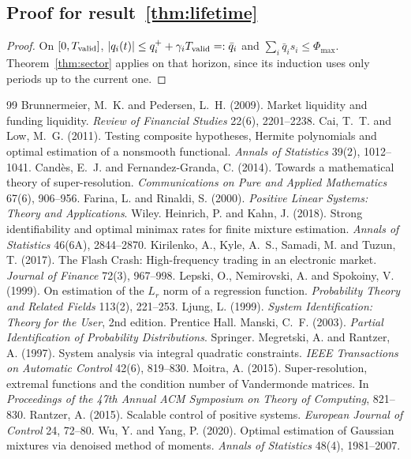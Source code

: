 \documentclass[11pt]{article}
\theoremstyle{definition}
\theoremstyle{remark}
\begin{document}
\subsection{Proof for result~\ref{thm:lifetime}}\label{app:paper3proof5}
\begin{proof}
On $[0,T_{\rm valid}]$, $|q_i(t)|\le q_i^++\gamma_iT_{\rm valid}=:\bar q_i$ and $\sum_i\bar q_is_i\le\Phi_{\max}$. Theorem~\ref{thm:sector} applies on that horizon, since its induction uses only periods up to the current one.
\end{proof}
\begin{thebibliography}{99}\setlength{\itemsep}{2pt}\small
{} Brunnermeier, M.~K. and Pedersen, L.~H. (2009). Market liquidity and funding liquidity. \emph{Review of Financial Studies} 22(6), 2201--2238.
 Cai, T.~T. and Low, M.~G. (2011). Testing composite hypotheses, Hermite polynomials and optimal estimation of a nonsmooth functional. \emph{Annals of Statistics} 39(2), 1012--1041.
 Cand\`es, E.~J. and Fernandez-Granda, C. (2014). Towards a mathematical theory of super-resolution. \emph{Communications on Pure and Applied Mathematics} 67(6), 906--956.
 Farina, L. and Rinaldi, S. (2000). \emph{Positive Linear Systems: Theory and Applications}. Wiley.
 Heinrich, P. and Kahn, J. (2018). Strong identifiability and optimal minimax rates for finite mixture estimation. \emph{Annals of Statistics} 46(6A), 2844--2870.
 Kirilenko, A., Kyle, A.~S., Samadi, M. and Tuzun, T. (2017). The Flash Crash: High-frequency trading in an electronic market. \emph{Journal of Finance} 72(3), 967--998.
 Lepski, O., Nemirovski, A. and Spokoiny, V. (1999). On estimation of the $L_r$ norm of a regression function. \emph{Probability Theory and Related Fields} 113(2), 221--253.
 Ljung, L. (1999). \emph{System Identification: Theory for the User}, 2nd edition. Prentice Hall.
 Manski, C.~F. (2003). \emph{Partial Identification of Probability Distributions}. Springer.
 Megretski, A. and Rantzer, A. (1997). System analysis via integral quadratic constraints. \emph{IEEE Transactions on Automatic Control} 42(6), 819--830.
 Moitra, A. (2015). Super-resolution, extremal functions and the condition number of Vandermonde matrices. In \emph{Proceedings of the 47th Annual ACM Symposium on Theory of Computing}, 821--830.
 Rantzer, A. (2015). Scalable control of positive systems. \emph{European Journal of Control} 24, 72--80.
 Wu, Y. and Yang, P. (2020). Optimal estimation of Gaussian mixtures via denoised method of moments. \emph{Annals of Statistics} 48(4), 1981--2007.


\end{thebibliography}
\end{document}
